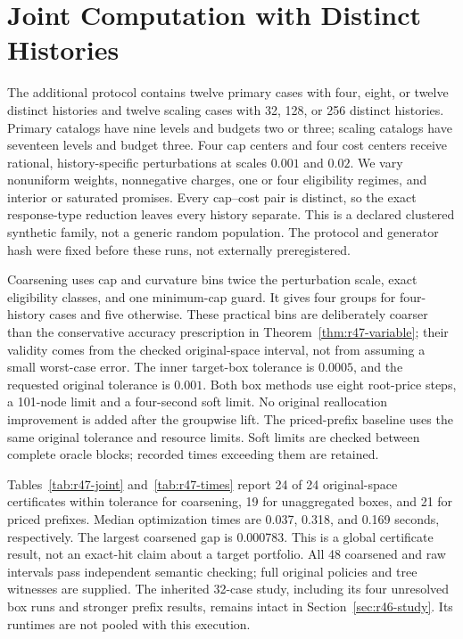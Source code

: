 \section{Joint Computation with Distinct Histories}\label{sec:r47-study}
The additional protocol contains twelve primary cases with four, eight, or twelve distinct histories and twelve scaling cases with 32, 128, or 256 distinct histories. Primary catalogs have nine levels and budgets two or three; scaling catalogs have seventeen levels and budget three. Four cap centers and four cost centers receive rational, history-specific perturbations at scales $0.001$ and $0.02$. We vary nonuniform weights, nonnegative charges, one or four eligibility regimes, and interior or saturated promises. Every cap--cost pair is distinct, so the exact response-type reduction leaves every history separate. This is a declared clustered synthetic family, not a generic random population. The protocol and generator hash were fixed before these runs, not externally preregistered.

Coarsening uses cap and curvature bins twice the perturbation scale, exact eligibility classes, and one minimum-cap guard. It gives four groups for four-history cases and five otherwise. These practical bins are deliberately coarser than the conservative accuracy prescription in Theorem~\ref{thm:r47-variable}; their validity comes from the checked original-space interval, not from assuming a small worst-case error. The inner target-box tolerance is $0.0005$, and the requested original tolerance is $0.001$. Both box methods use eight root-price steps, a 101-node limit and a four-second soft limit. No original reallocation improvement is added after the groupwise lift. The priced-prefix baseline uses the same original tolerance and resource limits. Soft limits are checked between complete oracle blocks; recorded times exceeding them are retained.

Tables~\ref{tab:r47-joint} and~\ref{tab:r47-times} report 24 of 24 original-space certificates within tolerance for coarsening, 19 for unaggregated boxes, and 21 for priced prefixes. Median optimization times are 0.037, 0.318, and 0.169 seconds, respectively. The largest coarsened gap is 0.000783. This is a global certificate result, not an exact-hit claim about a target portfolio. All 48 coarsened and raw intervals pass independent semantic checking; full original policies and tree witnesses are supplied. The inherited 32-case study, including its four unresolved box runs and stronger prefix results, remains intact in Section~\ref{sec:r46-study}. Its runtimes are not pooled with this execution.

